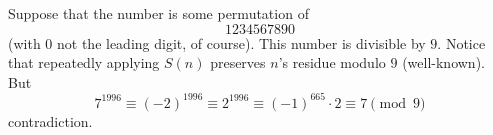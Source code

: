 Suppose that the number is some permutation of
$$1234567890$$
(with $0$ not the leading digit, of course). This number is divisible by $9$. Notice that
repeatedly applying $S(n)$ preserves $n$'s residue modulo $9$ (well-known).
But
$$7^{1996}\equiv (-2)^{1996}\equiv 2^{1996}\equiv (-1)^{665}\cdot 2\equiv 7\pmod{9}$$
contradiction.

